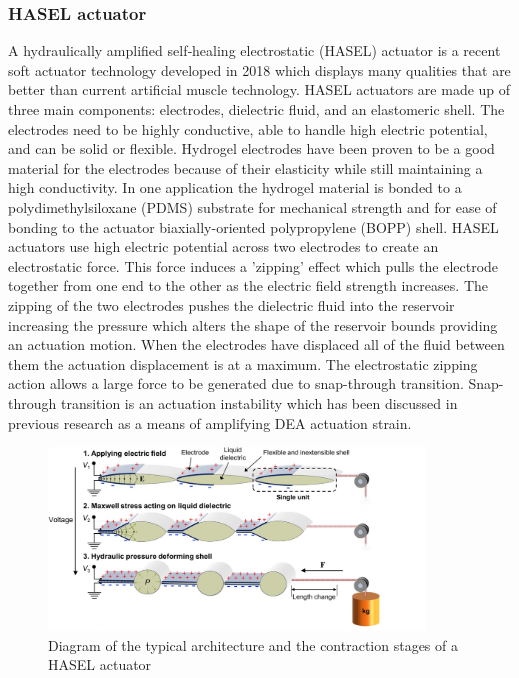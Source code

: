 \subsubsection{HASEL actuator}
A hydraulically amplified self‐healing electrostatic (HASEL) actuator is a recent soft actuator technology developed in 2018\citep{Kellaris2018} which displays many qualities that are better than current artificial muscle technology. HASEL actuators are made up of three main components: electrodes, dielectric fluid, and an elastomeric shell. The electrodes need to be highly conductive, able to handle high electric potential, and can be solid or flexible. Hydrogel electrodes have been proven to be a good material for the electrodes because of their elasticity while still maintaining a high conductivity\citep{Acome2018}. In one application the hydrogel material is bonded to a polydimethylsiloxane (PDMS) substrate for mechanical strength and for ease of bonding to the actuator biaxially-oriented polypropylene (BOPP) shell\citep{Kellaris2018,Yuk2016}. HASEL actuators use high electric potential across two electrodes to create an electrostatic force. This force induces a 'zipping' effect which pulls the electrode together from one end to the other as the electric field strength increases. The zipping of the two electrodes pushes the dielectric fluid into the reservoir increasing the pressure which alters the shape of the reservoir bounds providing an actuation motion. When the electrodes have displaced all of the fluid between them the actuation displacement is at a maximum. The electrostatic zipping action allows a large force to be generated due to snap-through transition. Snap-through transition is an actuation instability which has been discussed in previous research as a means of amplifying DEA actuation strain\citep{Keplinger2012}. 
\begin{figure}[h!]
  \centering
  \includegraphics[width=10cm]{Figures/HASEL_actuator_crop.jpg}
  \caption{Diagram of the typical architecture and the contraction stages of a HASEL actuator\citep{Kellaris2018}}
  \label{fig:Artificial Muscle}
\end{figure}
